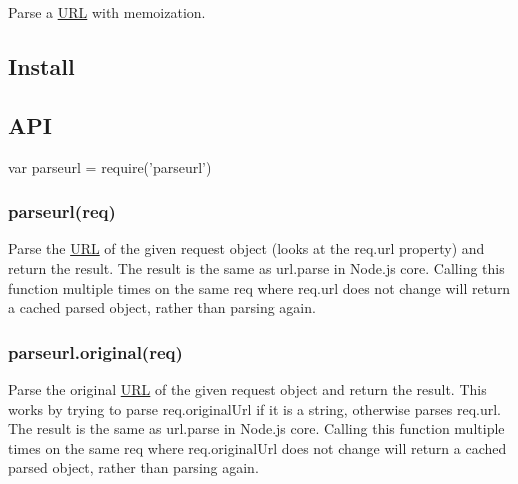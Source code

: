 \href{https://npmjs.org/package/parseurl}{\tt } \href{https://npmjs.org/package/parseurl}{\tt } \href{http://nodejs.org/download/}{\tt } \href{https://travis-ci.org/pillarjs/parseurl}{\tt } \href{https://coveralls.io/r/pillarjs/parseurl?branch=master}{\tt }

Parse a \mbox{\hyperlink{namespace_u_r_l}{U\+RL}} with memoization.

\subsection*{Install}




\subsection*{A\+PI}


\begin{DoxyCode}
var parseurl = require('parseurl')
\end{DoxyCode}


\subsubsection*{parseurl(req)}

Parse the \mbox{\hyperlink{namespace_u_r_l}{U\+RL}} of the given request object (looks at the {\ttfamily req.\+url} property) and return the result. The result is the same as {\ttfamily url.\+parse} in Node.\+js core. Calling this function multiple times on the same {\ttfamily req} where {\ttfamily req.\+url} does not change will return a cached parsed object, rather than parsing again.

\subsubsection*{parseurl.\+original(req)}

Parse the original \mbox{\hyperlink{namespace_u_r_l}{U\+RL}} of the given request object and return the result. This works by trying to parse {\ttfamily req.\+original\+Url} if it is a string, otherwise parses {\ttfamily req.\+url}. The result is the same as {\ttfamily url.\+parse} in Node.\+js core. Calling this function multiple times on the same {\ttfamily req} where {\ttfamily req.\+original\+Url} does not change will return a cached parsed object, rather than parsing again.

